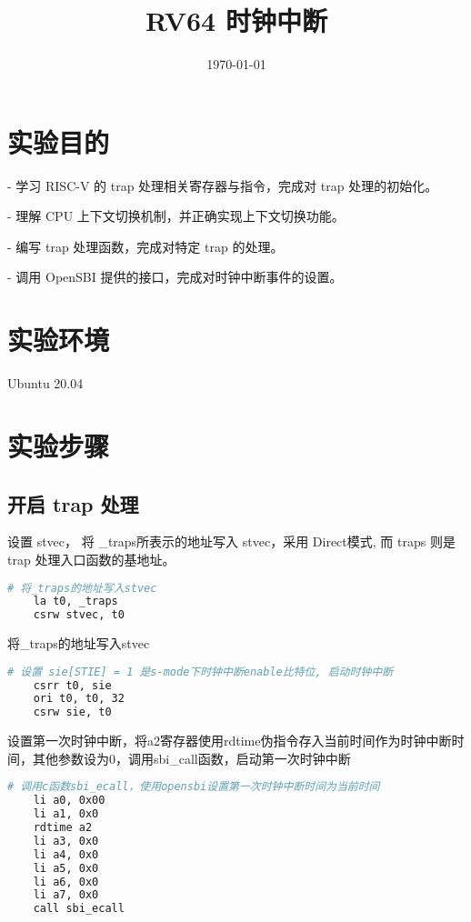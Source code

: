 \documentclass{source/Report}
\title{RV64 时钟中断}
\date{\today}
\begin{document}
\makecover
\makeheader
\section{实验目的}
- 学习 RISC-V 的 trap 处理相关寄存器与指令，完成对 trap 处理的初始化。

- 理解 CPU 上下文切换机制，并正确实现上下文切换功能。

- 编写 trap 处理函数，完成对特定 trap 的处理。

- 调用 OpenSBI 提供的接口，完成对时钟中断事件的设置。

\section{实验环境}
Ubuntu 20.04

\section{实验步骤}
\subsection{开启 trap 处理}

设置 stvec， 将 \_traps所表示的地址写入 stvec，采用 Direct模式, 而 traps 则是 trap 处理入口函数的基地址。

\begin{lstlisting}[language = bash, title = {将\_traps的地址写入stvec}]
    # 将_traps的地址写入stvec
    la t0, _traps
    csrw stvec, t0
\end{lstlisting}

将\_traps的地址写入stvec

\begin{lstlisting}[language = bash, title = {启动时钟中断}]
    # 设置 sie[STIE] = 1 是s-mode下时钟中断enable比特位, 启动时钟中断
    csrr t0, sie
    ori t0, t0, 32
    csrw sie, t0
\end{lstlisting}

设置第一次时钟中断，将a2寄存器使用rdtime伪指令存入当前时间作为时钟中断时间，其他参数设为0，调用sbi\_call函数，启动第一次时钟中断

\begin{lstlisting}[language = bash, title = {设置第一次时钟中断}]
    # 调用c函数sbi_ecall，使用opensbi设置第一次时钟中断时间为当前时间
    li a0, 0x00
    li a1, 0x0
    rdtime a2
    li a3, 0x0
    li a4, 0x0
    li a5, 0x0
    li a6, 0x0
    li a7, 0x0
    call sbi_ecall
\end{lstlisting}
\end{document}
